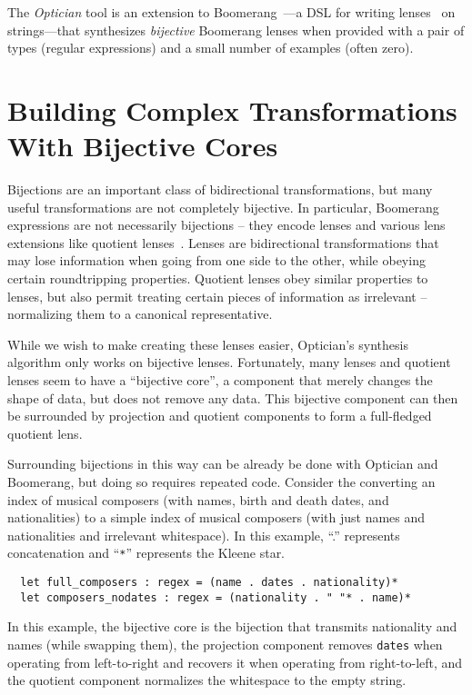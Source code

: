 \documentclass[a4paper]{article}
\begin{document}
The {\em Optician} tool is an extension to Boomerang~\cite{boomerang}---a
DSL for writing lenses~\cite{Focal2005-long2} on strings---that synthesizes
{\em bijective} Boomerang lenses when provided with a pair of types (regular
expressions) and a small number of examples (often zero).

\section{Building Complex Transformations With Bijective Cores}

Bijections are an important class of bidirectional transformations, but many
useful transformations are not completely bijective. In particular, Boomerang
expressions are not necessarily bijections -- they encode lenses and
various lens extensions like quotient lenses~\cite{quotientlenses}. Lenses are
bidirectional transformations that may lose information when going from one side
to the other, while obeying certain roundtripping properties. Quotient lenses
obey similar properties to lenses, but also permit treating certain pieces of
information as irrelevant -- normalizing them to a canonical representative.

While we wish to make creating these lenses easier, Optician's synthesis
algorithm only works on bijective lenses. Fortunately, many lenses and quotient
lenses seem to have a ``bijective core'', a component that merely changes the
shape of data, but does not remove any data. This bijective component can then
be surrounded by projection and quotient components to form a full-fledged
quotient lens.

Surrounding bijections in this way can be already be done with Optician
and Boomerang, but doing so requires repeated code. Consider the
converting an index of musical composers (with names, birth and death
dates, and nationalities) to a simple index of musical composers (with just
names and nationalities and irrelevant whitespace). In this example, ``.''
represents concatenation and ``\lstinline{*}'' represents the Kleene star.

\begin{lstlisting}
  let full_composers : regex = (name . dates . nationality)*
  let composers_nodates : regex = (nationality . " "* . name)*
\end{lstlisting}

In this example, the bijective core is the bijection that transmits nationality and
names (while swapping them), the projection component removes \lstinline{dates}
when operating from left-to-right and recovers it when operating from right-to-left,
and the quotient component normalizes the whitespace to the empty string.
\end{document}
